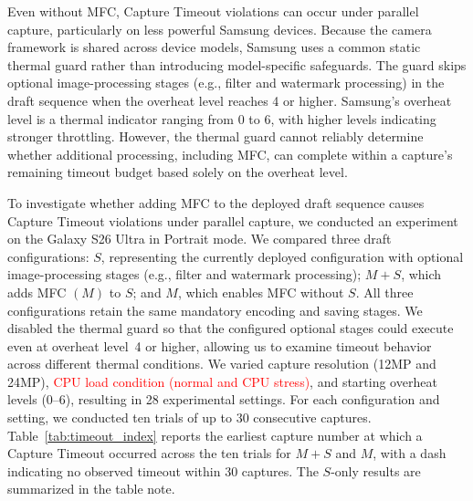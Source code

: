 

Even without MFC, Capture Timeout violations can occur under parallel capture, particularly on less powerful Samsung devices.
Because the camera framework is shared across device models, Samsung uses a common static thermal guard rather than introducing model-specific safeguards.
The guard skips optional image-processing stages (e.g., filter and watermark processing) in the draft sequence when the overheat level reaches 4 or higher.
Samsung's overheat level is a thermal indicator ranging from 0 to 6, with higher levels indicating stronger throttling.
However, the thermal guard cannot reliably determine whether additional processing, including MFC, can complete within a capture's remaining timeout budget based solely on the overheat level.

To investigate whether adding MFC to the deployed draft sequence causes Capture Timeout violations under parallel capture, we conducted an experiment on the Galaxy S26 Ultra in Portrait mode.
We compared three draft configurations: \(S\), representing the currently deployed configuration with optional image-processing stages (e.g., filter and watermark processing); \(M+S\), which adds MFC \((M)\) to \(S\); and \(M\), which enables MFC without \(S\).
All three configurations retain the same mandatory encoding and saving stages.
We disabled the thermal guard so that the configured optional stages could execute even at overheat level~4 or higher, allowing us to examine timeout behavior across different thermal conditions.
We varied capture resolution (12MP and 24MP), \textcolor{red}{CPU load condition (normal and CPU stress)}, and starting overheat levels (0--6), resulting in 28 experimental settings.
For each configuration and setting, we conducted ten trials of up to 30 consecutive captures.
Table~\ref{tab:timeout_index} reports the earliest capture number at which a Capture Timeout occurred across the ten trials for \(M+S\) and \(M\), with a dash indicating no observed timeout within 30 captures.
The \(S\)-only results are summarized in the table note.



